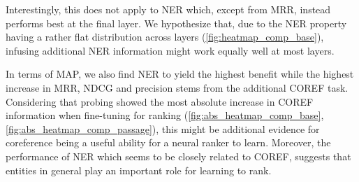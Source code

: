 Interestingly, this does not apply to NER which, except from MRR, instead performs best at the final layer. We hypothesize that, due to the NER property having a rather flat distribution across layers (\autoref{fig:heatmap_comp_base}), infusing additional NER information might work equally well at most layers.

In terms of MAP, we also find NER to yield the highest benefit while the highest increase in MRR, NDCG and precision stems from the additional COREF task. Considering that probing showed the most absolute increase in COREF information when fine-tuning for ranking (\autoref{fig:abs_heatmap_comp_base}, \autoref{fig:abs_heatmap_comp_passage}), this might be additional evidence for coreference being a useful ability for a neural ranker to learn. Moreover, the performance of NER which seems to be closely related to COREF, suggests that entities in general play an important role for learning to rank.

